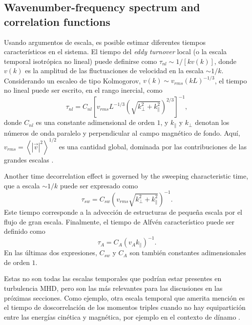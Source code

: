 \subsection{Wavenumber-frequency spectrum and correlation functions}\label{sec_Wfspectrum_and_Gamma}

Usando argumentos de escala, es posible estimar diferentes tiempos
característicos en el sistema. El tiempo del \textit{eddy turnover}
local (o la escala temporal isotrópica no lineal) puede definirse como
$\tau_{nl} \sim 1/\left[ k v(k) \right]$, donde $v(k)$ es la amplitud
de las fluctuaciones de velocidad en la escala $\sim
1/k$. Considerando un escaleo de tipo Kolmogorov,
$v(k) \sim v_{rms} \left(kL\right)^{-1/3}$, el tiempo no lineal puede
ser escrito, en el rango inercial, como
\begin{equation}
\tau_{nl} = C_{nl} \left [
   v_{rms} L^{-1/3} \left(\sqrt{k^2_\perp +
   k^2_\parallel}\right)^{2/3}\right ]^{-1},
\label{eq:taunl}
\end{equation}
donde $C_{nl}$ es una constante adimensional de orden $1$, y
$k_\parallel$ y $k_\perp$ denotan los números de onda paralelo y
perpendicular al campo magnético de fondo. Aquí,
$v_{rms} = \left\langle |\vec{v}|^2 \right\rangle ^{1/2}$ es una
cantidad global, dominada por las contribuciones de las grandes
escalas \cite{zhou_magnetohydrodynamic_2004,
  matthaeus_anisotropic_2009}.

{\color{red}Another time decorrelation effect is governed by the
  sweeping characteristic time}, que a escala $\sim 1/k$ puede ser
expresado como
\begin{equation}
\tau_{sw} = C_{sw} \left( v_{rms}\sqrt{k^2_\perp + k^2_\parallel}
    \right)^{-1} .
\label{eq:tausw}
\end{equation}
Este tiempo corresponde a la advección de estructuras de pequeña
escala por el flujo de gran escala. Finalmente, el tiempo de Alfvén
característico puede ser definido como
\begin{equation}
\tau_A= C_A \left( v_A k_\parallel \right)^{-1} .
\label{eq:taua}
\end{equation}
En las últimas dos expresiones, $C_{sw}$ y $C_A$ son también
constantes adimensionales de orden $1$.

Estas no son todas las escalas temporales que podrían estar presentes
en turbulencia MHD, pero son las más relevantes para las discusiones
en las próximas secciones.  Como ejemplo, otra escala temporal que
amerita mención es el tiempo de doscorrelación de los momentos triples
cuando no hay equipartición entre las energías cinética y magnética,
por ejemplo en el contexto de dínamo \cite{baerenzung_2008_spectral}.


